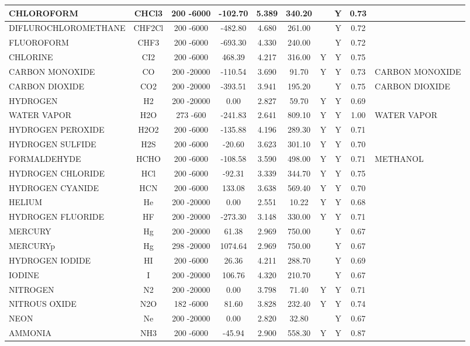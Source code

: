 \begin{longtable}{@{\extracolsep{\fill}}|l|c|c|c|c|c|c|c|c|l|}
	CHLOROFORM&CHCl3&200 -6000& -102.70& 5.389&   340.20& &Y& 0.73&\\ \hline
	DIFLUROCHLOROMETHANE&CHF2Cl&200 -6000& -482.80& 4.680&   261.00& &Y& 0.72&\\ \hline
	FLUOROFORM&CHF3&200 -6000& -693.30& 4.330&   240.00& &Y& 0.72&\\ \hline
	CHLORINE&CI2&200 -6000&  468.39& 4.217&   316.00&Y&Y& 0.75&\\ \hline
	CARBON MONOXIDE&CO&200 -20000& -110.54& 3.690&    91.70&Y&Y& 0.73&CARBON MONOXIDE\\ \hline
	CARBON DIOXIDE&CO2&200 -20000& -393.51& 3.941&   195.20& &Y& 0.75&CARBON DIOXIDE\\ \hline
	HYDROGEN&H2&200 -20000&    0.00& 2.827&    59.70&Y&Y& 0.69&\\ \hline
	WATER VAPOR&H2O&273 -600& -241.83& 2.641&   809.10&Y&Y& 1.00&WATER VAPOR\\ \hline
	HYDROGEN PEROXIDE&H2O2&200 -6000& -135.88& 4.196&   289.30&Y&Y& 0.71&\\ \hline
	HYDROGEN SULFIDE&H2S&200 -6000&  -20.60& 3.623&   301.10&Y&Y& 0.70&\\ \hline
	FORMALDEHYDE&HCHO&200 -6000& -108.58& 3.590&   498.00&Y&Y& 0.71&METHANOL\\ \hline
	HYDROGEN CHLORIDE&HCl&200 -6000&  -92.31& 3.339&   344.70&Y&Y& 0.75&\\ \hline
	HYDROGEN CYANIDE&HCN&200 -6000&  133.08& 3.638&   569.40&Y&Y& 0.70&\\ \hline
	HELIUM&He&200 -20000&    0.00& 2.551&    10.22&Y&Y& 0.68&\\ \hline
	HYDROGEN FLUORIDE&HF&200 -20000& -273.30& 3.148&   330.00&Y&Y& 0.71&\\ \hline
	MERCURY&Hg&200 -20000&   61.38& 2.969&   750.00& &Y& 0.67&\\ \hline
	MERCURYp&Hg&298 -20000& 1074.64& 2.969&   750.00& &Y& 0.67&\\ \hline
	HYDROGEN IODIDE&HI&200 -6000&   26.36& 4.211&   288.70& &Y& 0.69&\\ \hline
	IODINE&I&200 -20000&  106.76& 4.320&   210.70& &Y& 0.67&\\ \hline
	NITROGEN&N2&200 -20000&    0.00& 3.798&    71.40&Y&Y& 0.71&\\ \hline
	NITROUS OXIDE&N2O&182 -6000&   81.60& 3.828&   232.40&Y&Y& 0.74&\\ \hline
	NEON&Ne&200 -20000&    0.00& 2.820&    32.80& &Y& 0.67&\\ \hline
	AMMONIA&NH3&200 -6000&  -45.94& 2.900&   558.30&Y&Y& 0.87&\\ \hline

\end{longtable}
